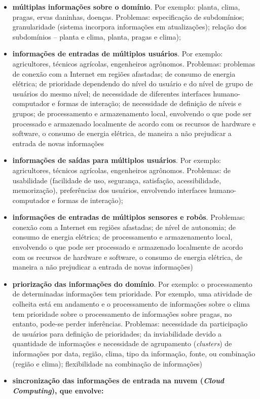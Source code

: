 \documentclass[12pt]{article}
\begin{document}
\begin{itemize}
	\item \textbf{múltiplas informações sobre o domínio}. Por exemplo: planta, clima, pragas, ervas daninhas, doenças. Problemas: especificação de subdomínios; granularidade (sistema incorpora informações em atualizações); relação dos subdomínios – planta e clima, planta, pragas e clima);
	\item \textbf{informações de entradas de múltiplos usuários}. Por exemplo: agricultores, técnicos agrícolas, engenheiros agrônomos. Problemas: problemas de conexão com a Internet em regiões afastadas; de consumo de energia elétrica; de prioridade dependendo do nível do usuário e do nível de grupo de usuários do mesmo nível; de necessidade de diferentes interfaces humano-computador e formas de interação; de necessidade de definição de níveis e grupos; de processamento e armazenamento local, envolvendo o que pode ser processado e armazenado localmente de acordo com os recursos de hardware e software, o consumo de energia elétrica, de maneira a não prejudicar a entrada de novas informações
	\item \textbf{informações de saídas para múltiplos usuários}. Por exemplo: agricultores, técnicos agrícolas, engenheiros agrônomos. Problemas: de usabilidade (facilidade de uso, segurança, satisfação, acessibilidade, memorização), preferências dos usuários, envolvendo interfaces humano-computador e formas de interação);
	\item \textbf{informações de entradas de múltiplos sensores e robôs}. Problemas: conexão com a Internet em regiões afastadas; de nível de autonomia; de consumo de energia elétrica; de processamento e armazenamento local, envolvendo o que pode ser processado e armazenado localmente de acordo com os recursos de hardware e software, o consumo de energia elétrica, de maneira a não prejudicar a entrada de novas informações)
	\item \textbf{priorização das informações do domínio}. Por exemplo: o processamento de determinadas informações tem prioridade. Por exemplo, uma atividade de colheita está em andamento e o processamento de informações sobre o clima tem prioridade sobre o processamento de informações sobre pragas, no entanto, pode-se perder inferências. Problemas: necessidade da participação de usuários para definição de prioridades; da inviabilidade devido a quantidade de informações e necessidade de agrupamento (\textit{clusters}) de informações por data, região, clima, tipo da informação, fonte, ou combinação (região e clima); flexibilidade na combinação de informações)
	\item \textbf{sincronização das informações de entrada na nuvem (\textit{Cloud Computing}), que  envolve:}

\end{itemize}
\end{document}
